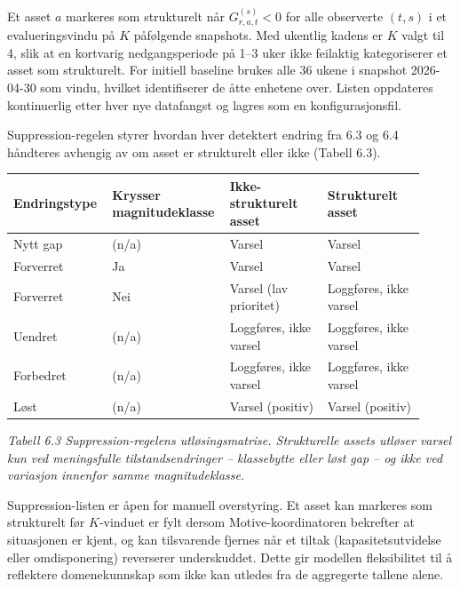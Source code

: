 \documentclass[a4paper,11pt]{article}
\begin{document}
Et asset $a$ markeres som strukturelt når $G_{r,a,t}^{(s)} < 0$ for alle observerte $(t, s)$ i et evalueringsvindu på $K$ påfølgende snapshots. Med ukentlig kadens er $K$ valgt til 4, slik at en kortvarig nedgangsperiode på 1–3 uker ikke feilaktig kategoriserer et asset som strukturelt. For initiell baseline brukes alle 36 ukene i snapshot 2026-04-30 som vindu, hvilket identifiserer de åtte enhetene over. Listen oppdateres kontinuerlig etter hver nye datafangst og lagres som en konfigurasjonsfil.

Suppression-regelen styrer hvordan hver detektert endring fra 6.3 og 6.4 håndteres avhengig av om asset er strukturelt eller ikke (Tabell 6.3).

\begin{longtable}{|>{\RaggedRight}p{0.230\linewidth}|>{\RaggedRight}p{0.230\linewidth}|>{\RaggedRight}p{0.230\linewidth}|>{\RaggedRight}p{0.230\linewidth}|}
\hline
\textbf{Endringstype} & \textbf{Krysser magnitudeklasse} & \textbf{Ikke-strukturelt asset} & \textbf{Strukturelt asset} \\
\hline
\endhead
Nytt gap & (n/a) & Varsel & Varsel \\
\hline
Forverret & Ja & Varsel & Varsel \\
\hline
Forverret & Nei & Varsel (lav prioritet) & Loggføres, ikke varsel \\
\hline
Uendret & (n/a) & Loggføres, ikke varsel & Loggføres, ikke varsel \\
\hline
Forbedret & (n/a) & Loggføres, ikke varsel & Loggføres, ikke varsel \\
\hline
Løst & (n/a) & Varsel (positiv) & Varsel (positiv) \\
\hline
\end{longtable}

\begin{center}\small\textit{Tabell 6.3 Suppression-regelens utløsingsmatrise. Strukturelle assets utløser varsel kun ved meningsfulle tilstandsendringer – klassebytte eller løst gap – og ikke ved variasjon innenfor samme magnitudeklasse.}\end{center}

Suppression-listen er åpen for manuell overstyring. Et asset kan markeres som strukturelt før $K$-vinduet er fylt dersom Motive-koordinatoren bekrefter at situasjonen er kjent, og kan tilsvarende fjernes når et tiltak (kapasitetsutvidelse eller omdisponering) reverserer underskuddet. Dette gir modellen fleksibilitet til å reflektere domenekunnskap som ikke kan utledes fra de aggregerte tallene alene.
\end{document}

